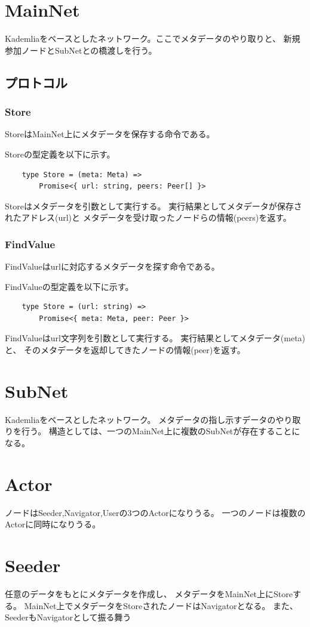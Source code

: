 \documentclass[sotsuron]{jcsie}
\begin{document}
\section{MainNet}
Kademliaをベースとしたネットワーク。ここでメタデータのやり取りと、
新規参加ノードとSubNetとの橋渡しを行う。
\subsection{プロトコル}
\subsubsection{Store}
StoreはMainNet上にメタデータを保存する命令である。

Storeの型定義を以下に示す。
\begin{lstlisting}
	type Store = (meta: Meta) => 
		Promise<{ url: string, peers: Peer[] }>
\end{lstlisting}
Storeはメタデータを引数として実行する。
実行結果としてメタデータが保存されたアドレス(url)と
メタデータを受け取ったノードらの情報(peers)を返す。

\subsubsection{FindValue}
FindValueはurlに対応するメタデータを探す命令である。

FindValueの型定義を以下に示す。
\begin{lstlisting}
	type Store = (url: string) => 
		Promise<{ meta: Meta, peer: Peer }>
\end{lstlisting}
FindValueはurl文字列を引数として実行する。
実行結果としてメタデータ(meta)と、
そのメタデータを返却してきたノードの情報(peer)を返す。

\section{SubNet}
Kademliaをベースとしたネットワーク。
メタデータの指し示すデータのやり取りを行う。
構造としては、一つのMainNet上に複数のSubNetが存在することになる。

\section{Actor}
ノードはSeeder,Navigator,Userの3つのActorになりうる。
一つのノードは複数のActorに同時になりうる。
\section{Seeder}
任意のデータをもとにメタデータを作成し、
メタデータをMainNet上にStoreする。
MainNet上でメタデータをStoreされたノードはNavigatorとなる。
また、SeederもNavigatorとして振る舞う
\end{document}
